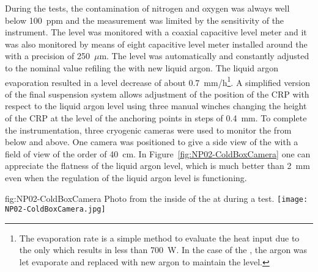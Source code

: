 During the tests, the contamination of nitrogen and oxygen was always well below 100~ppm and the measurement was limited by the sensitivity of the instrument.
The level was monitored with a coaxial capacitive level meter and it was also monitored by means of eight capacitive level meter installed around the  with a precision of 250~$\mu$m.
The level was automatically and constantly adjusted to the nominal value refiling the  \coldbox with new liquid argon.
The liquid argon evaporation resulted in a level decrease of about 0.7~mm/h\footnote{The evaporation rate is a simple method to evaluate the heat input due to the  \coldbox only which results in less than 700~W. In the case of the   \coldbox, the argon was let evaporate and replaced with new argon to maintain the level.}.
A simplified version of the  final suspension system allows adjustment of the position of the CRP with respect to the liquid argon level using three manual winches changing the height of the CRP at the level of the anchoring points in steps of 0.4~mm.
To complete the  \coldbox instrumentation, three cryogenic cameras were used to monitor the  from below and above.
One camera was positioned to give a side view of the  with a field of view of the order of 40~cm.
In Figure~\ref{fig:NP02-ColdBoxCamera} one can appreciate the flatness of the liquid argon level, which is much better than 2~mm even when the regulation of the liquid argon level is functioning.
\begin{dunefigure}{fig:NP02-ColdBoxCamera}
{Photo from the inside of the  \coldbox at  during a  test.}
\texttt{[image: NP02-ColdBoxCamera.jpg]}
\end{dunefigure}


